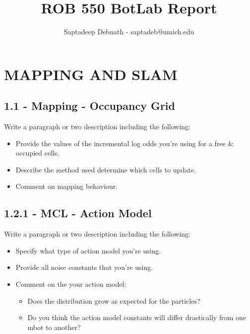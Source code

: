 \documentclass[journal,onecolumn]{IEEEtran}
\begin{document}
\title{%
  ROB 550 BotLab Report \\
  }
    
\author{Saptadeep Debnath - saptadeb@umich.edu}

\maketitle

\IEEEpeerreviewmaketitle

\section{MAPPING AND SLAM}

\subsection*{1.1 - Mapping - Occupancy Grid} 

Write a paragraph or two description including the following:

\begin{itemize}
    \item Provide the values of the incremental log odds you're using for a free \& occupied cells.
    \item Describe the method used determine which cells to update.
    \item Comment on mapping behaviour.
\end{itemize}

\subsection*{1.2.1 - MCL - Action Model} 

 Write a paragraph or two description including the following:
 \begin{itemize}
    \item Specify what type of action model you're using.
    \item Provide all noise constants that you're using.
    \item Comment on the your action model:
        \begin{itemize}
            \item Does the distribution grow as expected for the particles?
            \item Do you think the action model constants will differ drastically from one
mbot to another?
        \end{itemize}
\end{itemize}
\end{document}
